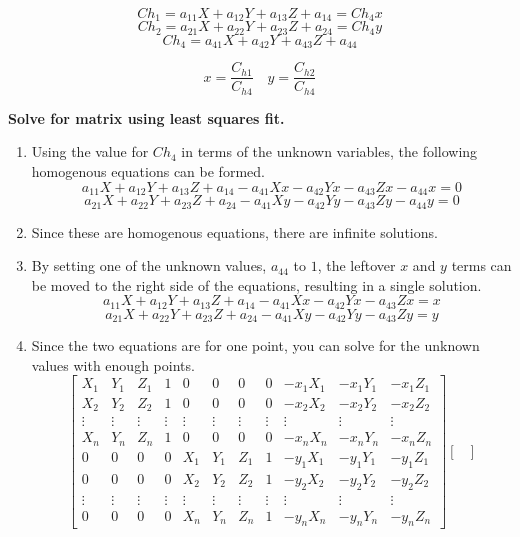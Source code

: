 \documentclass{article}
\begin{document}
\[Ch_1 = a_{11}X + a_{12}Y + a_{13}Z + a_{14} = Ch_4 x\]
\[Ch_2 = a_{21}X + a_{22}Y + a_{23}Z + a_{24} = Ch_4 y\]
\[Ch_4 = a_{41}X + a_{42}Y + a_{43}Z + a_{44}\]

\[x = \frac{C_{h1}}{C_{h4}} \quad y = \frac{C_{h2}}{C_{h4}}\]

\textbf{Solve for matrix using least squares fit.}

\begin{enumerate}
    \item Using the value for $Ch_4$ in terms of the unknown variables, the following homogenous
    equations can be formed.
    \[a_{11}X + a_{12}Y + a_{13}Z + a_{14} - a_{41}Xx - a_{42}Yx - a_{43}Zx - a_{44}x = 0\]
    \[a_{21}X + a_{22}Y + a_{23}Z + a_{24} - a_{41}Xy - a_{42}Yy - a_{43}Zy - a_{44}y = 0\]
    \item Since these are homogenous equations, there are infinite solutions.
    \item By setting one of the unknown values, $a_{44}$ to $1$, the leftover $x$ and $y$ terms can
    be moved to the right side of the equations, resulting in a single solution.
    \[a_{11}X + a_{12}Y + a_{13}Z + a_{14} - a_{41}Xx - a_{42}Yx - a_{43}Zx = x\]
    \[a_{21}X + a_{22}Y + a_{23}Z + a_{24} - a_{41}Xy - a_{42}Yy - a_{43}Zy = y\]
    \item Since the two equations are for one point, you can solve for the unknown values with
    enough points.
    \[\begin{bmatrix}
        X_1 & Y_1 & Z_1 & 1 & 0 & 0 & 0 & 0 & -x_1 X_1 & -x_1 Y_1 & -x_1 Z_1 \\
        X_2 & Y_2 & Z_2 & 1 & 0 & 0 & 0 & 0 & -x_2 X_2 & -x_2 Y_2 & -x_2 Z_2 \\
        \vdots & \vdots & \vdots & \vdots & \vdots & \vdots & \vdots & \vdots & \vdots & \vdots &
        \vdots \\
        X_n & Y_n & Z_n & 1 & 0 & 0 & 0 & 0 & -x_n X_n & -x_n Y_n & -x_n Z_n \\
        0 & 0 & 0 & 0 & X_1 & Y_1 & Z_1 & 1 & -y_1 X_1 & -y_1 Y_1 & -y_1 Z_1 \\
        0 & 0 & 0 & 0 & X_2 & Y_2 & Z_2 & 1 & -y_2 X_2 & -y_2 Y_2 & -y_2 Z_2 \\
        \vdots & \vdots & \vdots & \vdots & \vdots & \vdots & \vdots & \vdots & \vdots & \vdots &
        \vdots \\
        0 & 0 & 0 & 0 & X_n & Y_n & Z_n & 1 & -y_n X_n & -y_n Y_n & -y_n Z_n
    \end{bmatrix}\begin{bmatrix}

\end{bmatrix}\]
\end{enumerate}
\end{document}
